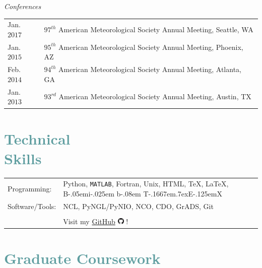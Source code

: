 \documentclass[margin,line,palatino,courier,10pt]{res}
\def\BibTeX{{\rm B\kern-.05em{\sc i\kern-.025em b}\kern-.08em
    T\kern-.1667em\lower.7ex\hbox{E}\kern-.125emX}}
\begin{document}
\begin{resume}
\textit{Conferences}
\vspace*{0.05in}\\
\begin{tabular}{@{}p{0.8in}p{4in}}
Jan. $2017$ & $97^ {th} $ American Meteorological Society Annual Meeting, Seattle, WA \\
Jan. $2015$ & $95^ {th} $ American Meteorological Society Annual Meeting, Phoenix, AZ \\
Feb. $2014$ & $94^ {th} $ American Meteorological Society Annual Meeting, Atlanta, GA \\
Jan. $2013$ & $93^ {rd} $ American Meteorological Society Annual Meeting, Austin, TX \\
\end{tabular}

\section{\sc \textcolor{CadetBlue}{\large{Technical \\ Skills}}}
\vspace*{0.05in}
\begin{tabular}{@{}p{0.8in}p{6in}}

Programming:& Python, \texttt{MATLAB}, Fortran, Unix, HTML, \TeX, \LaTeX, \BibTeX \\
Software/Tools: & NCL, PyNGL/PyNIO, NCO, CDO, GrADS, Git\\\\

& Visit my \href{https://github.com/zmlabe}{GitHub} \includegraphics[height=9pt]{github.png} !\\
\end{tabular}


\noindent\makebox[\linewidth][r]{\rule{\textwidth}{5pt}}
\vspace{-0.3in}

\section{\sc \textcolor{CadetBlue}{\large{Graduate Coursework}}}


\end{resume}
\end{document}
